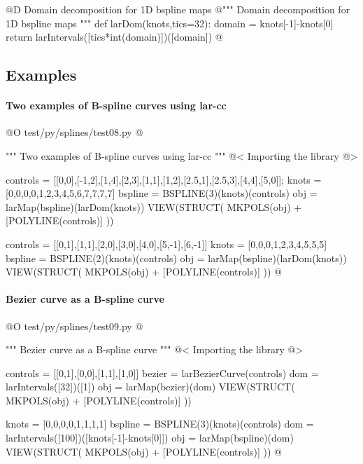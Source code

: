 \documentclass[11pt,oneside]{article}	%
\begin{document}
@D Domain decomposition for 1D bspline maps
@{""" Domain decomposition for 1D bspline maps """
def larDom(knots,tics=32): 
	domain = knots[-1]-knots[0]
	return larIntervals([tics*int(domain)])([domain])
@}

\subsection{Examples}

\paragraph{Two examples of B-spline curves using lar-cc}

@O test/py/splines/test08.py
@{""" Two examples of B-spline curves using lar-cc """
@< Importing the library @>

controls = [[0,0],[-1,2],[1,4],[2,3],[1,1],[1,2],[2.5,1],[2.5,3],[4,4],[5,0]];
knots = [0,0,0,0,1,2,3,4,5,6,7,7,7,7]
bspline = BSPLINE(3)(knots)(controls)
obj = larMap(bspline)(larDom(knots))
VIEW(STRUCT( MKPOLS(obj) + [POLYLINE(controls)] ))

controls = [[0,1],[1,1],[2,0],[3,0],[4,0],[5,-1],[6,-1]]
knots = [0,0,0,1,2,3,4,5,5,5]
bspline = BSPLINE(2)(knots)(controls)
obj = larMap(bspline)(larDom(knots))
VIEW(STRUCT( MKPOLS(obj) + [POLYLINE(controls)] ))
@}


\paragraph{Bezier curve as a B-spline curve}

@O test/py/splines/test09.py
@{""" Bezier curve as a B-spline curve """
@< Importing the library @>

controls = [[0,1],[0,0],[1,1],[1,0]]
bezier = larBezierCurve(controls)
dom = larIntervals([32])([1])
obj = larMap(bezier)(dom)
VIEW(STRUCT( MKPOLS(obj) + [POLYLINE(controls)] ))

knots = [0,0,0,0,1,1,1,1]
bspline = BSPLINE(3)(knots)(controls)
dom = larIntervals([100])([knots[-1]-knots[0]])
obj = larMap(bspline)(dom)
VIEW(STRUCT( MKPOLS(obj) + [POLYLINE(controls)] ))
@}
\end{document}
